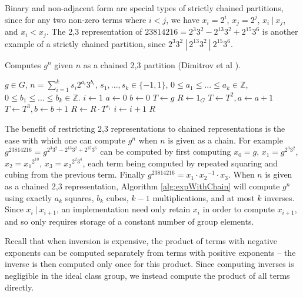 \documentclass{ucalgthes1}
\theoremstyle{definition}
\newcommand{\ZZ}{\mathbb{Z}}
\begin{document}
\noindent
Binary and non-adjacent form are special types of strictly chained partitions, since for any two non-zero terms where $i < j$, we have $x_i = 2^i$, $x_j = 2^j$, $ x_i ~|~ x_j$, and $x_i < x_j$.  The 2,3 representation of $23814216 = 2^3 3^2 - 2^{13} 3^2 + 2^{15} 3^6$ is another example of a strictly chained partition, since $2^3 3^2 ~|~ 2^{13} 3^2 ~|~ 2^{15} 3^6$.

\begin{algorithm}[htb]
\caption{Computes $g^n$ given $n$ as a chained 2,3 partition (Dimitrov et al \cite{Dimitrov2005}).}
\label{alg:expWithChain}
\begin{algorithmic}[1]
\Require $g \in G$, $n = \sum_{i=1}^k s_i2^{a_i}3^{b_i}$, $s_1,...,s_k \in \{-1, 1\}$, $0 \le a_1 \le ...\le a_k \in \ZZ$, $0 \le b_1 \le ... \le b_k \in \ZZ$.
\State $i \gets 1$
\State $a \gets 0$ 
\State $b \gets 0$ 
\State $T \gets g$ 
\State $R \gets 1_G$
		\State $T \gets T^2, a \gets a + 1$
	\EndWhile
		\State $T \gets T^3, b \gets b + 1$
	\EndWhile
	\State $R \gets R \cdot T^{s_i}$ 
	\State $i \gets i + 1$
\EndWhile
\State \Return $R$
\end{algorithmic}
\end{algorithm}

The benefit of restricting 2,3 representations to chained representations is the ease with which one can compute $g^n$ when $n$ is given as a chain.  For example $g^{23814216} = g^{2^3 3^2 - 2^{13} 3^2 + 2^{15} 3^6}$ can be computed by first computing $x_0 = g$, $x_1 = g^{2^3 3^2}$, $x_2 = {x_1}^{2^{10}}$, $x_3 = {x_2}^{2^2 3^4}$, each term being computed by repeated squaring and cubing from the previous term.  Finally $g^{23814216} = x_1 \cdot {x_2}^{-1} \cdot x_3$.  When $n$ is given as a chained 2,3 representation, Algorithm \ref{alg:expWithChain} will compute $g^n$ using exactly $a_k$ squares, $b_k$  cubes, $k-1$ multiplications, and at most $k$ inverses.  Since $x_i ~|~ x_{i+1}$, an implementation need only retain $x_i$ in order to compute $x_{i+1}$, and so only requires storage of a constant number of group elements.

Recall that when inversion is expensive, the product of terms with negative exponents can be computed separately from terms with positive exponents -- the inverse is then computed only once for this product.  Since computing inverses is negligible in the ideal class group, we instead compute the product of all terms directly.
\end{document}
